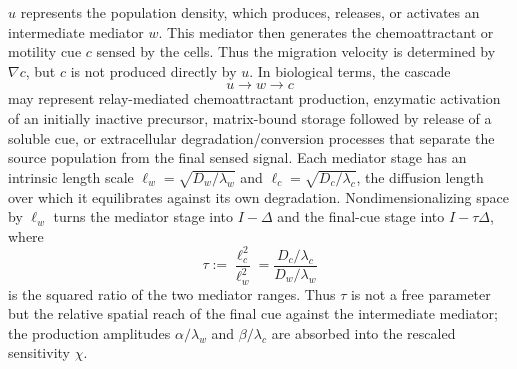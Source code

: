 \documentclass[pdflatex,sn-mathphys-num]{sn-jnl}%
\theoremstyle{thmstyleone}
\theoremstyle{thmstyletwo}
\theoremstyle{thmstylethree}
\begin{document}
$u$ represents the population density, which produces, releases, or
activates an intermediate mediator \(w\). This mediator then generates the
chemoattractant or motility cue \(c\) sensed by the cells. Thus the migration
velocity is determined by \(\nabla c\), but \(c\) is not produced directly by
\(u\).  In biological terms, the cascade
\[
        u \longrightarrow w \longrightarrow c
\]
may represent relay-mediated chemoattractant production, enzymatic activation
of an initially inactive precursor, matrix-bound storage followed by release of
a soluble cue, or extracellular degradation/conversion processes that separate
the source population from the final sensed signal.
Each mediator stage has an intrinsic length scale
\(\ell_w=\sqrt{D_w/\lambda_w}\) and \(\ell_c=\sqrt{D_c/\lambda_c}\), the
diffusion length over which it equilibrates against its own degradation.
Nondimensionalizing space by \(\ell_w\) turns the mediator stage into
\(I-\Delta\) and the final-cue stage into \(I-\tau\Delta\), where
\begin{equation}
\label{eq:tau-definition}
        \tau:=\frac{\ell_c^{2}}{\ell_w^{2}}
              =\frac{D_c/\lambda_c}{D_w/\lambda_w}
\end{equation}
is the squared ratio of the two mediator ranges. Thus \(\tau\) is not a free
parameter but the relative spatial reach of the final cue against the
intermediate mediator; the production amplitudes \(\alpha/\lambda_w\) and
\(\beta/\lambda_c\) are absorbed into the rescaled sensitivity \(\chi\).
\end{document}
